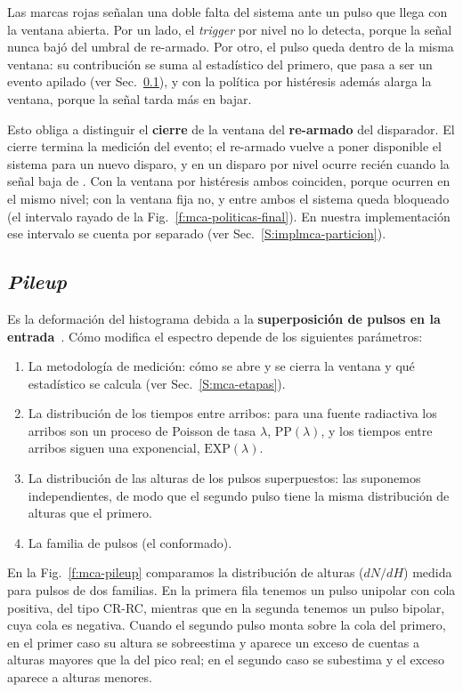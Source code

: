 Las marcas rojas señalan una doble falta del sistema ante un pulso que llega con
la ventana abierta. Por un lado, el \emph{trigger} por nivel no lo detecta, porque la
señal nunca bajó del umbral de re-armado. Por otro, el pulso queda dentro de la
misma ventana: su contribución se suma al estadístico del primero, que pasa a
ser un evento apilado (ver Sec.~\ref{S:mca-pileup}), y con la política por
histéresis además alarga la ventana, porque la señal tarda más en bajar.

Esto obliga a distinguir el \textbf{cierre} de la ventana del
\textbf{re-armado} del disparador. El cierre termina la medición del evento; el
re-armado vuelve a poner disponible el sistema para un nuevo disparo, y en un
disparo por nivel ocurre recién cuando la señal baja de . Con la
ventana por histéresis ambos coinciden, porque ocurren en el mismo nivel; con la
ventana fija no, y entre ambos el sistema queda bloqueado (el intervalo rayado
de la Fig.~\ref{f:mca-politicas-final}). En nuestra implementación ese intervalo
se cuenta por separado (ver Sec.~\ref{S:implmca-particion}).

\subsection{\texorpdfstring{\emph{Pileup}}{\emph{Pileup}}}
\label{S:mca-pileup}

Es la deformación del histograma debida a la \textbf{superposición de pulsos en
la entrada}~\cite{Knoll2010}. Cómo modifica el espectro depende de los
siguientes parámetros:
\begin{enumerate}
  \item La metodología de medición: cómo se abre y se cierra la ventana y qué
    estadístico se calcula (ver Sec.~\ref{S:mca-etapas}).
  \item La distribución de los tiempos entre arribos: para una fuente radiactiva
    los arribos son un proceso de Poisson de tasa $\lambda$,
    $\mathrm{PP}(\lambda)$, y los tiempos entre arribos siguen una exponencial,
    $\mathrm{EXP}(\lambda)$.
  \item La distribución de las alturas de los pulsos superpuestos: las suponemos
    independientes, de modo que el segundo pulso tiene la misma distribución de
    alturas que el primero.
  \item La familia de pulsos (el conformado).
\end{enumerate}

En la Fig.~\ref{f:mca-pileup} comparamos la distribución de alturas ($dN/dH$)
medida para pulsos de dos familias. En la primera fila tenemos un pulso unipolar
con cola positiva, del tipo CR-RC, mientras que en la segunda tenemos un pulso
bipolar, cuya cola es negativa. Cuando el segundo pulso monta sobre la cola del
primero, en el primer caso su altura se sobreestima y aparece un exceso de
cuentas a alturas mayores que la del pico real; en el segundo caso se subestima
y el exceso aparece a alturas menores.

